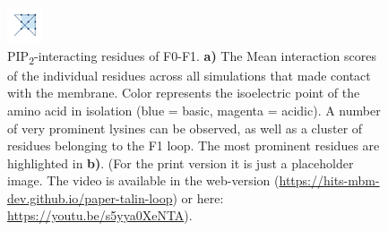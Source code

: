 \documentclass[
  twocolumn]{biophys-new-mod}
\begin{document}
\begin{figure}

\begin{minipage}[t]{\linewidth}

{\centering 


}

\subcaption{\label{fig-f0f1-ri-npip}~}
\end{minipage}%
\newline
\begin{minipage}[t]{\linewidth}

{\centering 

\includegraphics{./www/hits-logo-small.png}

}

\subcaption{\label{fig-f1f1-residues}~}
\end{minipage}%

\caption{\label{fig-f0f1-residues}PIP\textsubscript{2}-interacting
residues of F0-F1. \textbf{a)} The Mean interaction scores of the
individual residues across all simulations that made contact with the
membrane. Color represents the isoelectric point of the amino acid in
isolation (blue = basic, magenta = acidic). A number of very prominent
lysines can be observed, as well as a cluster of residues belonging to
the F1 loop. The most prominent residues are highlighted in \textbf{b)}.
(For the print version it is just a placeholder image. The video is
available in the web-version
(\url{https://hits-mbm-dev.github.io/paper-talin-loop}) or here:
\url{https://youtu.be/s5yya0XeNTA}).}

\end{figure}
\end{document}
